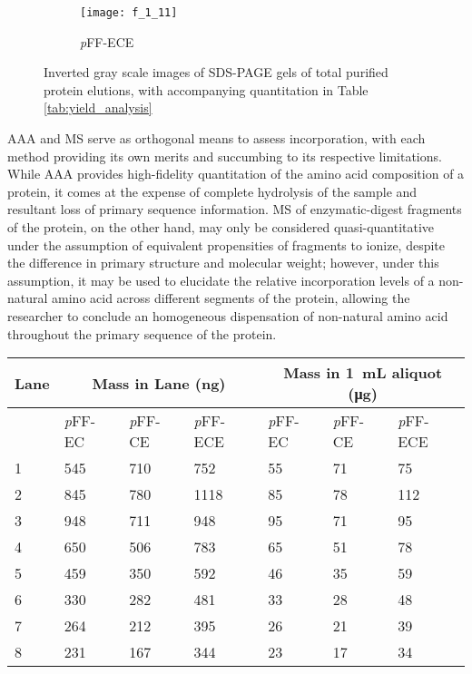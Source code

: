 \begin{refsection}
\begin{figure}[h!]
    \begin{subfigure}[b]{0.3\textwidth}
        \texttt{[image: f\_1\_11]}
        \caption{\emph{p}FF-ECE}
        \label{fig:C}
    \end{subfigure}
    \caption{Inverted gray scale images of SDS-PAGE gels of total purified
    protein elutions, with accompanying quantitation in Table
    \ref{tab:yield_analysis}}\label{fig:purification_gels}
\end{figure}
AAA and MS serve as orthogonal means to assess incorporation, with each method
providing its own merits and succumbing to its respective limitations. While AAA
provides high-fidelity quantitation of the amino acid composition of a protein,
it comes at the expense of complete hydrolysis of the sample and resultant loss
of primary sequence information. MS of enzymatic-digest fragments of the
protein, on the other hand, may only be considered quasi-quantitative under the
assumption of equivalent propensities of fragments to ionize, despite the
difference in primary structure and molecular weight; however, under this
assumption, it may be used to elucidate the relative incorporation levels of a
non-natural amino acid across different segments of the protein, allowing the
researcher to conclude an homogeneous dispensation of non-natural amino acid
throughout the primary sequence of the protein.
\begin{table}[h!]
    \centering
\begin{tabular}{ lllllll }
  \hline
  Lane & 
  \multicolumn{3}{c}{Mass in Lane (\si{\ng})} & 
  \multicolumn{3}{c}{Mass in \SI{1}{\mL} aliquot (\si{\ug})} \\
  \hline
  &
  \emph{p}FF-EC &
  \emph{p}FF-CE &
  \emph{p}FF-ECE &
  \emph{p}FF-EC &
  \emph{p}FF-CE &
  \emph{p}FF-ECE \\ 
  \hline
  1 & 545 & 710 & 752 & 55 & 71 & 75 \\
  2 & 845 & 780 & 1118 & 85 & 78 & 112 \\
  3 & 948 & 711 & 948 & 95 & 71 & 95 \\
  4 & 650 & 506 & 783 & 65 & 51 & 78 \\
  5 & 459 & 350 & 592 & 46 & 35 & 59 \\
  6 & 330 & 282 & 481 & 33 & 28 & 48 \\
  7 & 264 & 212 & 395 & 26 & 21 & 39 \\
  8 & 231 & 167 & 344 & 23 & 17 & 34 \\

\end{tabular}
\end{table}
\end{refsection}
